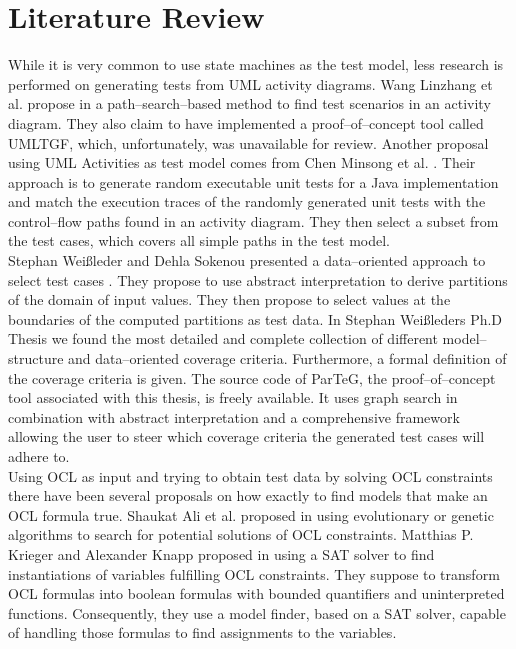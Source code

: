 \documentclass[runningheads,a4paper]{llncs}%
\begin{document}
\section{Literature Review}%
\label{sec:LiteratureReview}%
While it is very common to use state machines as the test model, less research is performed on generating tests from UML activity diagrams. Wang Linzhang et al. propose in \cite{Linzhang04GeneratingTestCasefromActivityGrayBoxMethod} a path--search--based method to find test scenarios in an activity diagram. They also claim to have implemented a proof--of--concept tool called UMLTGF, which, unfortunately, was unavailable for review. Another proposal using UML Activities as test model comes from Chen Minsong et al. \cite{mingsong2006automatic}. Their approach is to generate random executable unit tests for a Java implementation and match the execution traces of the randomly generated unit tests with the control--flow paths found in an activity diagram. They then select a subset from the test cases, which covers all simple paths in the test model.%
\\%
Stephan Wei{\ss}leder and Dehla Sokenou presented a data--oriented approach to select test cases \cite{weissleder2008automatic}. They propose to use abstract interpretation to derive partitions of the domain of input values. They then propose to select values at the boundaries of the computed partitions as test data. %
In Stephan Wei{\ss}leders Ph.D Thesis \cite{ParTeG} we found the most detailed and complete collection of different model--structure and data--oriented coverage criteria. Furthermore, a formal definition of the coverage criteria is given. The source code of ParTeG, the proof--of--concept tool associated with this thesis, is freely available. It uses graph search in combination with abstract interpretation and a comprehensive framework allowing the user to steer which coverage criteria the generated test cases will adhere to.\\
Using OCL as input and trying to obtain test data by solving OCL constraints there have been several proposals on how exactly to find models that make an OCL formula true. Shaukat Ali et al. proposed in \cite{ali2011search} using evolutionary or genetic algorithms to search for potential solutions of OCL constraints. Matthias P. Krieger and Alexander Knapp proposed in \cite{krieger2008executingUnderspecifiedOCL} using a SAT solver to find instantiations of variables fulfilling OCL constraints. They suppose to transform OCL formulas into boolean formulas with bounded quantifiers and uninterpreted functions. Consequently, they use a model finder, based on a SAT solver, capable of handling those formulas to find assignments to the variables.\\%
\end{document}
